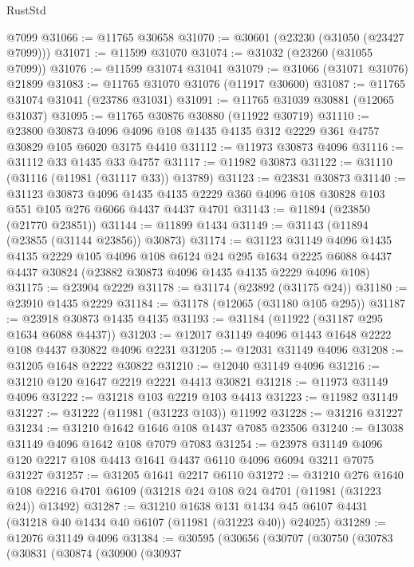 \begin{lexlean}{RustStd}
\begin{coremodule}
    @7099
@31066 := @11765 @30658
@31070 := @30601 (@23230 (@31050 (@23427 @7099)))
@31071 := @11599 @31070
@31074 := @31032 (@23260 (@31055 @7099))
@31076 := @11599 @31074 @31041
@31079 := @31066 (@31071 @31076) @21899
@31083 := @11765 @31070 @31076 (@11917 @30600)
@31087 := @11765 @31074 @31041 (@23786 @31031)
@31091 := @11765 @31039 @30881 (@12065 @31037)
@31095 := @11765 @30876 @30880 (@11922 @30719)
@31110 := @23800
    @30873
    @4096
    @4096
    @108
    @1435
    @4135
    @312
    @2229
    @361
    @4757
    @30829
    @105
    @6020
    @3175
    @4410
@31112 := @11973 @30873 @4096
@31116 := @31112 @33 @1435 @33 @4757
@31117 := @11982 @30873
@31122 := @31110 (@31116 (@11981 (@31117 @33)) @13789)
@31123 := @23831 @30873
@31140 := @31123
    @30873
    @4096
    @1435
    @4135
    @2229
    @360
    @4096
    @108
    @30828
    @103
    @551
    @105
    @276
    @6066
    @4437
    @4437
    @4701
@31143 := @11894 (@23850 (@21770 @23851))
@31144 := @11899 @1434
@31149 := @31143 (@11894 (@23855 (@31144 @23856)) @30873)
@31174 := @31123
    @31149
    @4096
    @1435
    @4135
    @2229
    @105
    @4096
    @108
    @6124
    @24
    @295
    @1634
    @2225
    @6088
    @4437
    @4437
    @30824
    (@23882 @30873 @4096 @1435 @4135 @2229 @4096 @108)
@31175 := @23904 @2229
@31178 := @31174 (@23892 (@31175 @24))
@31180 := @23910 @1435 @2229
@31184 := @31178 (@12065 (@31180 @105 @295))
@31187 := @23918 @30873 @1435 @4135
@31193 := @31184 (@11922 (@31187 @295 @1634 @6088 @4437))
@31203 := @12017 @31149 @4096 @1443 @1648 @2222 @108 @4437 @30822 @4096 @2231
@31205 := @12031 @31149 @4096
@31208 := @31205 @1648 @2222 @30822
@31210 := @12040 @31149 @4096
@31216 := @31210 @120 @1647 @2219 @2221 @4413 @30821
@31218 := @11973 @31149 @4096
@31222 := @31218 @103 @2219 @103 @4413
@31223 := @11982 @31149
@31227 := @31222 (@11981 (@31223 @103)) @11992
@31228 := @31216 @31227
@31234 := @31210 @1642 @1646 @108 @1437 @7085 @23506
@31240 := @13038 @31149 @4096 @1642 @108 @7079 @7083
@31254 := @23978 @31149 @4096 @120 @2217 @108 @4413 @1641 @4437 @6110 @4096 @6094 @3211 @7075 @31227
@31257 := @31205 @1641 @2217 @6110
@31272 := @31210
    @276
    @1640
    @108
    @2216
    @4701
    @6109
    (@31218 @24 @108 @24 @4701 (@11981 (@31223 @24)) @13492)
@31287 := @31210
    @1638
    @131
    @1434
    @45
    @6107
    @4431
    (@31218 @40 @1434 @40 @6107 (@11981 (@31223 @40)) @24025)
@31289 := @12076 @31149 @4096
@31384 := @30595
    (@30656
      (@30707
        (@30750
          (@30783
            (@30831
              (@30874
                (@30900
                  (@30937

\end{coremodule}
\end{lexlean}
